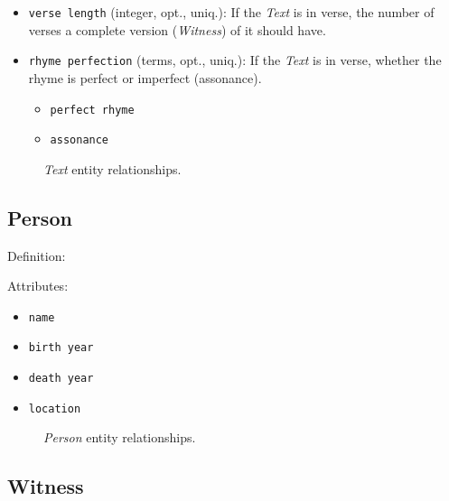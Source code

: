 \begin{itemize}
    \item \texttt{verse length} (integer, opt., uniq.): If the \textit{Text} is in verse, the number of verses a complete version (\textit{Witness}) of it should have.
    \item \texttt{rhyme perfection} (terms, opt., uniq.): If the \textit{Text} is in verse, whether the rhyme is perfect or imperfect (assonance).
    \begin{multicols}{4}
        \begin{itemize}
            \item \texttt{perfect rhyme}
            \item \texttt{assonance}
        \end{itemize}
    \end{multicols}
\end{itemize}

\begin{figure}[ht]
    \begin{center}
        
    \end{center}
\label{fig:TextER}
\caption{\textit{Text} entity relationships.}
\end{figure}


\subsection{Person}

Definition: 

\vspace{1em}
\noindent Attributes:
\begin{itemize}
    \item \texttt{name}
    \item \texttt{birth year}
    \item \texttt{death year}
    \item \texttt{location}
\end{itemize}

\begin{figure}[ht]
    \begin{center}
        
    \end{center}
\label{fig:PersonER}
\caption{\textit{Person} entity relationships.}
\end{figure}


\subsection{Witness}

